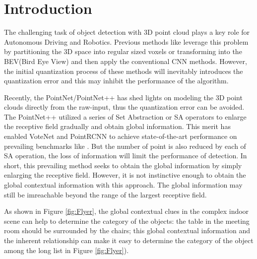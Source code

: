 \documentclass[runningheads]{llncs}
\begin{document}
\section{Introduction}
The challenging task of object detection with 3D point cloud plays a key role for Autonomous Driving and Robotics. Previous methods  like \cite{voxelnet} leverage this problem by partitioning the 3D space into regular sized voxels or transforming into the BEV(Bird Eye View) \cite{pixor} and then apply the conventional CNN methods.
However, the initial quantization process of these methods will inevitably introduces the quantization error and this may inhibit the performance of the algorithm.

Recently, the PointNet/PointNet++ \cite{pointnet,pointnet++} has shed lights  on modeling the 3D point clouds directly from the raw-input, thus the quantization error can be avoided. The PointNet++ utilized a series  of Set Abstraction or SA operators to enlarge the receptive field gradually and obtain global information. This merit has enabled  VoteNet\cite{VoteNet} and PointRCNN \cite{PointRCNN} to achieve  state-of-the-art performance on prevailing benchmarks like \cite{SUN_RGBD,SCannet}. But the number of point is also reduced by each of SA operation, the loss of information will limit the performance  of  detection. In short, this prevailing  method  seeks to obtain the global information by simply enlarging the receptive field. However, it is not instinctive enough to obtain the global contextual information with this approach. The global information may still be imreachable beyond the range of the largest receptive field. %


As shown in Figure \ref{fig:Flyer}, the global contextual clues in the complex indoor scene can help to determine the category of the objects:  the table in the meeting room should be surrounded by the chairs; this  global contextual information and the inherent relationship can make it easy  to determine the category of the object among the long list in Figure \ref{fig:Flyer}).
\end{document}
